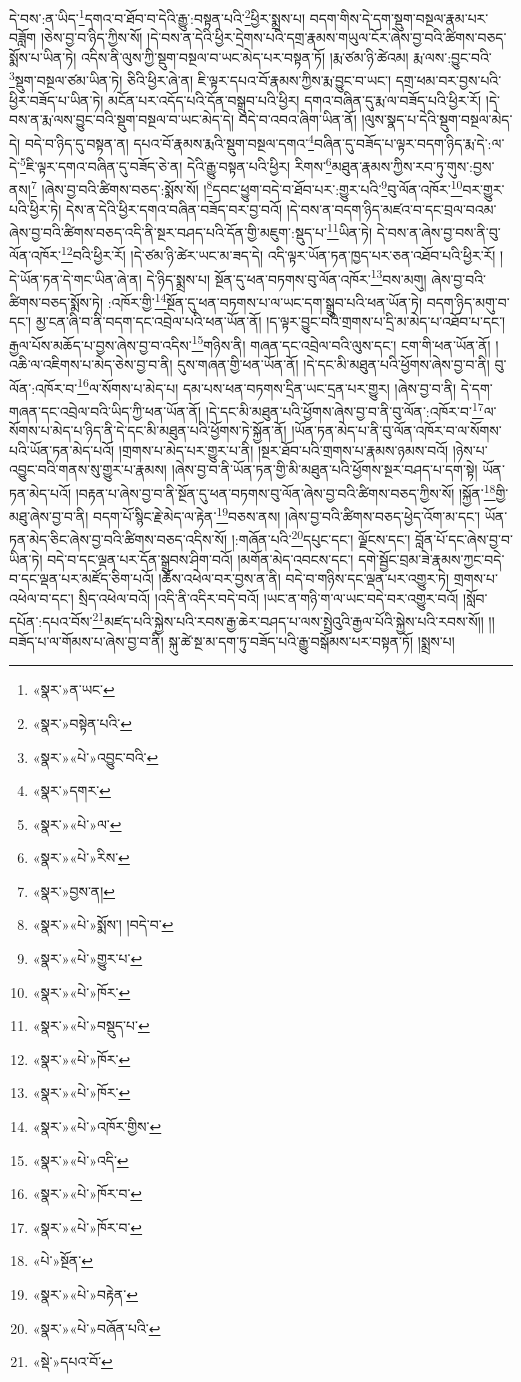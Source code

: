 དེ་བས་:ན་ཡིད་\footnote{«སྣར་»ན་ཡང་}དགའ་བ་ཐོབ་བ་དེའི་རྒྱུ་:བསྟན་པའི་\footnote{«སྣར་»བསྟེན་པའི་}ཕྱིར་སྨྲས་པ། བདག་གིས་དེ་དག་སྡུག་བསྔལ་རྣམ་པར་བཟློག །ཅེས་བྱ་བ་ཉིད་ཀྱིས་སོ། །དེ་བས་ན་དེའི་ཕྱིར་དྲེགས་པའི་དགྲ་རྣམས་གཡུལ་ངོར་ཞེས་བྱ་བའི་ཚིགས་བཅད་སྨོས་པ་ཡིན་ཏེ། འདིས་ནི་ལུས་ཀྱི་སྡུག་བསྔལ་བ་ཡང་མེད་པར་བསྟན་ཏོ། །རྨ་ཙམ་ཉི་ཚེའམ། རྨ་ལས་:བྱུང་བའི་\footnote{«སྣར་»«པེ་»འབྱུང་བའི་}སྡུག་བསྔལ་ཙམ་ཡིན་ཏེ། ཅིའི་ཕྱིར་ཞེ་ན། ཇི་ལྟར་དཔའ་བོ་རྣམས་ཀྱིས་རྨ་བྱུང་བ་ཡང་། དགྲ་ཕམ་བར་བྱས་པའི་ཕྱིར་བཟོད་པ་ཡིན་ཏེ། མངོན་པར་འདོད་པའི་དོན་བསྒྲུབ་པའི་ཕྱིར། དགའ་བཞིན་དུ་རྨ་ལ་བཟོད་པའི་ཕྱིར་རོ། །དེ་བས་ན་རྨ་ལས་བྱུང་བའི་སྡུག་བསྔལ་བ་ཡང་མེད་དེ། བདེ་བ་འབའ་ཞིག་ཡིན་ནོ། །ལུས་སྣད་པ་དེའི་སྡུག་བསྔལ་མེད་དེ། བདེ་བ་ཉིད་དུ་བསྟན་ན། དཔའ་བོ་རྣམས་རྨའི་སྡུག་བསྔལ་དགའ་\footnote{«སྣར་»དགར་}བཞིན་དུ་བཟོད་པ་ལྟར་བདག་ཉིད་རྨ་དེ་:ལ་དེ་\footnote{«སྣར་»«པེ་»ལ་}ཇི་ལྟར་དགའ་བཞིན་དུ་བཟོད་ཅེ་ན། དེའི་རྒྱུ་བསྟན་པའི་ཕྱིར། རིགས་\footnote{«སྣར་»«པེ་»རིས་}མཐུན་རྣམས་ཀྱིས་རབ་ཏུ་གུས་:བྱས་ནས།\footnote{«སྣར་»བྱས་ན།} །ཞེས་བྱ་བའི་ཚིགས་བཅད་:སྨོས་སོ། །\footnote{«སྣར་»«པེ་»སྨོས་། །བདེ་བ་}དབང་ཕྱུག་བདེ་བ་ཐོབ་པར་:གྱུར་པའི་\footnote{«སྣར་»«པེ་»གྱུར་པ་}བུ་ལོན་འཁོར་\footnote{«སྣར་»«པེ་»ཁོར་}བར་གྱུར་པའི་ཕྱིར་ཏེ། དེས་ན་དེའི་ཕྱིར་དགའ་བཞིན་བཟོད་བར་བྱ་བའོ། །དེ་བས་ན་བདག་ཉིད་མཛའ་བ་དང་བྲལ་བའམ་ཞེས་བྱ་བའི་ཚིགས་བཅད་འདི་ནི་སྔར་བཤད་པའི་དོན་གྱི་མཇུག་:སྡུད་པ་\footnote{«སྣར་»«པེ་»བསྡུད་པ་}ཡིན་ཏེ། དེ་བས་ན་ཞེས་བྱ་བས་ནི་བུ་ལོན་འཁོར་\footnote{«སྣར་»«པེ་»ཁོར་}བའི་ཕྱིར་རོ། །དེ་ཙམ་ཉི་ཚེར་ཡང་མ་ཟད་དེ། འདི་ལྟར་ཡོན་ཏན་ཁྱད་པར་ཅན་འཐོབ་པའི་ཕྱིར་རོ། །དེ་ཡོན་ཏན་དེ་གང་ཡིན་ཞེ་ན། དེ་ཉིད་སྨྲས་པ། སྔོན་དུ་ཕན་བཏགས་བུ་ལོན་འཁོར་\footnote{«སྣར་»«པེ་»ཁོར་}བས་མགུ། ཞེས་བྱ་བའི་ཚིགས་བཅད་སྨོས་ཏེ། :འཁོར་གྱི་\footnote{«སྣར་»«པེ་»འཁོར་གྱིས་}སྔོན་དུ་ཕན་བཏགས་པ་ལ་ཡང་དག་སྒྲུབ་པའི་ཕན་ཡོན་ཏེ། བདག་ཉིད་མགུ་བ་དང་། མྱ་ངན་ཞི་བ་ནི་བདག་དང་འབྲེལ་པའི་ཕན་ཡོན་ནོ། །ད་ལྟར་བྱུང་བའི་གྲགས་པ་དྲི་མ་མེད་པ་འཐོབ་པ་དང་། རྒྱལ་པོས་མཆོད་པ་བྱས་ཞེས་བྱ་བ་འདིས་\footnote{«སྣར་»«པེ་»འདི་}གཉིས་ནི། གཞན་དང་འབྲེལ་བའི་ལུས་དང་། ངག་གི་ཕན་ཡོན་ནོ། །འཆི་ལ་འཇིགས་པ་མེད་ཅེས་བྱ་བ་ནི། དུས་གཞན་གྱི་ཕན་ཡོན་ནོ། །དེ་དང་མི་མཐུན་པའི་ཕྱོགས་ཞེས་བྱ་བ་ནི། བུ་ལོན་:འཁོར་བ་\footnote{«སྣར་»«པེ་»ཁོར་བ་}ལ་སོགས་པ་མེད་པ། དམ་པས་ཕན་བཏགས་དྲིན་ཡང་དྲན་པར་གྱུར། །ཞེས་བྱ་བ་ནི། དེ་དག་གཞན་དང་འབྲེལ་བའི་ཡིད་ཀྱི་ཕན་ཡོན་ནོ། །དེ་དང་མི་མཐུན་པའི་ཕྱོགས་ཞེས་བྱ་བ་ནི་བུ་ལོན་:འཁོར་བ་\footnote{«སྣར་»«པེ་»ཁོར་བ་}ལ་སོགས་པ་མེད་པ་ཉིད་ནི་དེ་དང་མི་མཐུན་པའི་ཕྱོགས་ཏེ་སྐྱོན་ནོ། །ཡོན་ཏན་མེད་པ་ནི་བུ་ལོན་འཁོར་བ་ལ་སོགས་པའི་ཡོན་ཏན་མེད་པའོ། །གྲགས་པ་མེད་པར་གྱུར་པ་ནི། །སྔར་ཐོབ་པའི་གྲགས་པ་རྣམས་ཉམས་བའོ། །ཉེས་པ་འབྱུང་བའི་གནས་སུ་གྱུར་པ་རྣམས། །ཞེས་བྱ་བ་ནི་ཡོན་ཏན་གྱི་མི་མཐུན་པའི་ཕྱོགས་སྔར་བཤད་པ་དག་སྟེ། ཡོན་ཏན་མེད་པའོ། །བརྟན་པ་ཞེས་བྱ་བ་ནི་སྔོན་དུ་ཕན་བཏགས་བུ་ལོན་ཞེས་བྱ་བའི་ཚིགས་བཅད་ཀྱིས་སོ། །སྐྱོན་\footnote{«པེ་»སྔོན་}གྱི་མཐུ་ཞེས་བྱ་བ་ནི། བདག་པོ་སྙིང་རྗེ་མེད་ལ་རྟེན་\footnote{«སྣར་»«པེ་»བརྟེན་}བཅས་ནས། །ཞེས་བྱ་བའི་ཚིགས་བཅད་ཕྱེད་འོག་མ་དང་། ཡོན་ཏན་མེད་ཅིང་ཞེས་བྱ་བའི་ཚིགས་བཅད་འདིས་སོ། །:གཞོན་པའི་\footnote{«སྣར་»«པེ་»བཞོན་པའི་}དཔུང་དང་། ལྗོངས་དང་། བློན་པོ་དང་ཞེས་བྱ་བ་ཡིན་ཏེ། བདེ་བ་དང་ལྡན་པར་དོན་སྒྲུབས་ཤིག་བའོ། །མགོན་མེད་འབངས་དང་། དགེ་སྦྱོང་བྲམ་ཟེ་རྣམས་ཀྱང་བདེ་བ་དང་ལྡན་པར་མཛོད་ཅིག་པའོ། །ཆོས་འཕེལ་བར་བྱས་ན་ནི། བདེ་བ་གཉིས་དང་ལྡན་པར་འགྱུར་ཏེ། གྲགས་པ་འཕེལ་བ་དང་། སྲིད་འཕེལ་བའོ། །འདི་ནི་འདིར་བདེ་བའོ། །ཡང་ན་གཉི་ག་ལ་ཡང་བདེ་བར་འགྱུར་བའོ། །སློབ་དཔོན་:དཔའ་བོས་\footnote{«སྡེ་»དཔའ་བོ་}མཛད་པའི་སྐྱེས་པའི་རབས་རྒྱ་ཆེར་བཤད་པ་ལས་སྤྲེའུའི་རྒྱལ་པོའི་སྐྱེས་པའི་རབས་སོ།། །།བཟོད་པ་ལ་གོམས་པ་ཞེས་བྱ་བ་ནི། སྐུ་ཚེ་སྔ་མ་དག་ཏུ་བཟོད་པའི་རྒྱུ་བསྒོམས་པར་བསྟན་ཏོ། །སྨྲས་པ། 